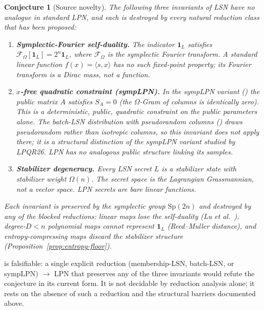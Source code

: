 \documentclass[11pt,a4paper]{article}
\theoremstyle{plain}
\newtheorem{conjecture}[theorem]{Conjecture}
\theoremstyle{definition}
\newcommand{\etal}{\textit{et al.}}
\begin{document}
\begin{conjecture}[Source novelty]
\label{conj:source}
The following three invariants of LSN have no analogue in standard LPN, and each is destroyed by every natural reduction class that has been proposed:
\begin{enumerate}
\item \textbf{Symplectic-Fourier self-duality.} The indicator $\mathbf{1}_L$ satisfies $\mathcal{F}_\Omega[\mathbf{1}_L] = 2^n \mathbf{1}_L$, where $\mathcal{F}_\Omega$ is the symplectic Fourier transform. A standard linear function $f(x)=\langle s,x\rangle$ has no such fixed-point property; its Fourier transform is a Dirac mass, not a function.
\item \textbf{$x$-free quadratic constraint (sympLPN).} In the sympLPN variant () the public matrix $A$ satisfies $S_A=0$ (the $\Omega$-Gram of columns is identically zero). This is a deterministic, public, quadratic constraint on the \emph{public parameters} alone. The batch-LSN distribution with pseudorandom columns () draws pseudorandom rather than isotropic columns, so this invariant does not apply there; it is a structural distinction of the sympLPN variant studied by LPQR26. LPN has no analogous public structure linking its samples.
\item \textbf{Stabilizer degeneracy.} Every LSN secret $L$ is a stabilizer state with stabilizer weight $\Omega(n)$. The secret space is the Lagrangian Grassmannian, not a vector space. LPN secrets are bare linear functions.
\end{enumerate}
Each invariant is preserved by the symplectic group $\mathrm{Sp}(2n)$ and destroyed by any of the blocked reductions: linear maps lose the self-duality (Lu \etal\ \cite{LPQR26}), degree-$D<n$ polynomial maps cannot represent $\mathbf{1}_L$ (Reed--Muller distance), and entropy-compressing maps discard the stabilizer structure (Proposition~\ref{prop:entropy-floor}).
\end{conjecture}

 is falsifiable: a single explicit reduction (membership-LSN, batch-LSN, or sympLPN) $\to$ LPN that preserves any of the three invariants would refute the conjecture in its current form. It is not decidable by reduction analysis alone; it rests on the absence of such a reduction and the structural barriers documented above.
\end{document}
